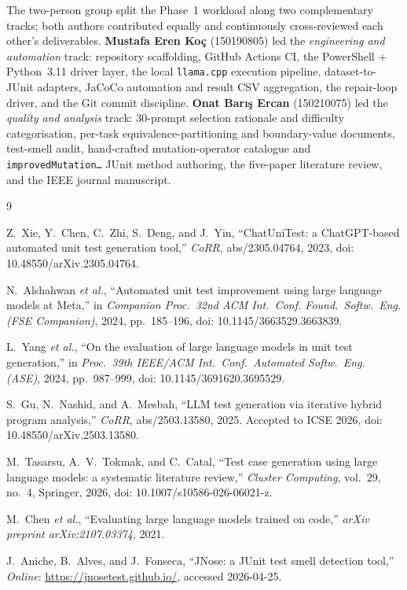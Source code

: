 \documentclass[journal]{IEEEtran}
\begin{document}
The two-person group split the Phase~1 workload along two complementary
tracks; both authors contributed equally and continuously cross-reviewed
each other's deliverables. \textbf{Mustafa Eren Ko\c{c}} (150190805) led the
\emph{engineering and automation} track: repository scaffolding, GitHub
Actions CI, the PowerShell + Python~3.11 driver layer, the local
\texttt{llama.cpp} execution pipeline, dataset-to-JUnit adapters, JaCoCo
automation and result CSV aggregation, the repair-loop driver, and the Git
commit discipline. \textbf{Onat Bar{\i}\c{s} Ercan} (150210075) led the
\emph{quality and analysis} track: 30-prompt selection rationale and
difficulty categorisation, per-task equivalence-partitioning and
boundary-value documents, test-smell audit, hand-crafted
mutation-operator catalogue and \texttt{improvedMutation\ldots} JUnit
method authoring, the five-paper literature review, and the IEEE journal
manuscript.

\begin{thebibliography}{9}

Z.~Xie, Y.~Chen, C.~Zhi, S.~Deng, and J.~Yin, ``ChatUniTest: a
ChatGPT-based automated unit test generation tool,'' \emph{CoRR},
abs/2305.04764, 2023, doi: 10.48550/arXiv.2305.04764.

N.~Alshahwan \emph{et al.}, ``Automated unit test improvement using large
language models at Meta,'' in \emph{Companion Proc.\ 32nd ACM Int.\ Conf.
Found.\ Softw.\ Eng. (FSE Companion)}, 2024, pp.~185--196, doi:
10.1145/3663529.3663839.

L.~Yang \emph{et al.}, ``On the evaluation of large language models in
unit test generation,'' in \emph{Proc.\ 39th IEEE/ACM Int.\ Conf.\
Automated Softw.\ Eng. (ASE)}, 2024, pp.~987--999, doi:
10.1145/3691620.3695529.

S.~Gu, N.~Nashid, and A.~Mesbah, ``LLM test generation via iterative
hybrid program analysis,'' \emph{CoRR}, abs/2503.13580, 2025. Accepted to
ICSE 2026, doi: 10.48550/arXiv.2503.13580.

M.~Tasarsu, A.~V.\ Tokmak, and C.~Catal, ``Test case generation using
large language models: a systematic literature review,'' \emph{Cluster
Computing}, vol.~29, no.~4, Springer, 2026, doi:
10.1007/s10586-026-06021-z.

M.~Chen \emph{et al.}, ``Evaluating large language models trained on
code,'' \emph{arXiv preprint arXiv:2107.03374}, 2021.

J.~Aniche, B.~Alves, and J.~Fonseca, ``JNose: a JUnit test smell detection
tool,'' \emph{Online}: \url{https://jnosetest.github.io/}, accessed
2026-04-25.

\end{thebibliography}
\end{document}
